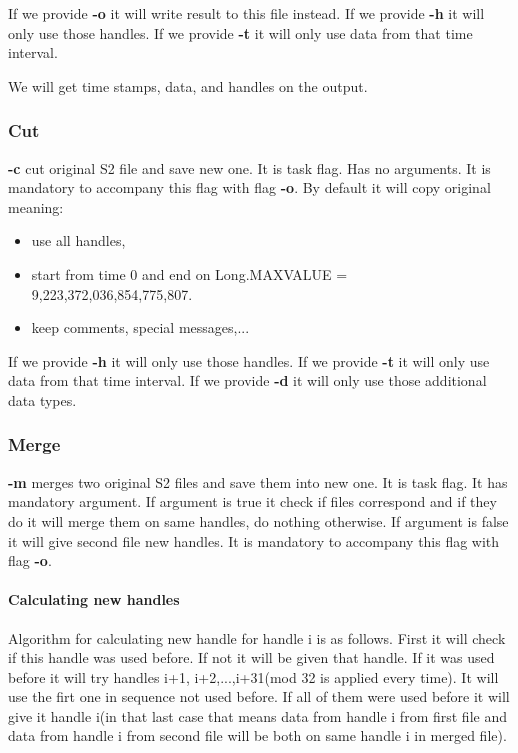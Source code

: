 \documentclass[english]{article}
\begin{document}
If we provide \textbf{-o} it will write result to this file instead.
If we provide \textbf{-h} it will only use those handles.
If we provide \textbf{-t} it will only use data from that time interval.

We will get time stamps, data, and handles on the output.

\subsubsection{Cut}
 \textbf{-c} cut original S2 file and save new one. It is task flag. Has no arguments. It is mandatory to accompany this flag with flag \textbf{-o}.
By default it will copy original meaning:
\begin{itemize}
\item use all handles,
\item start from time 0 and end on Long.MAXVALUE = 9,223,372,036,854,775,807.
\item keep comments, special messages,...
\end{itemize}

If we provide \textbf{-h} it will only use those handles.
If we provide \textbf{-t} it will only use data from that time interval.
If we provide \textbf{-d} it will only use those additional data types.

\subsubsection{Merge}
 \textbf{-m} merges two original S2 files and save them into new one. It is task flag. It has mandatory argument. If argument is true it check if files correspond and if they do it will merge them on same handles, do nothing otherwise. If argument is false it will give second file new handles. It is mandatory to accompany this flag with flag \textbf{-o}.

\paragraph{Calculating new handles}
Algorithm for calculating new handle for handle i is as follows. 
First it will check if this handle was used before. If not it will be given that handle. If it was used before it will try handles i+1, i+2,...,i+31(mod 32 is applied every time). It will use the firt one in sequence not used before. If all of them were used before it will give it handle i(in that last case that means data from handle i from first file and data from handle i from second file will be both on same handle i in merged file).
\end{document}
